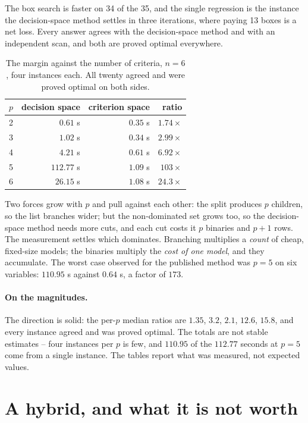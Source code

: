 \documentclass[11pt,a4paper]{article}
\begin{document}
The box search is faster on 34 of the 35, and the single regression is the
instance the decision-space method settles in three iterations, where paying 13
boxes is a net loss. Every answer agrees with the decision-space method and
with an independent scan, and both are proved optimal everywhere.

\begin{table}[h]
\centering
\caption{The margin against the number of criteria, $n = 6$, four instances
each. All twenty agreed and were proved optimal on both sides.}
\begin{tabular}{crrr}
\toprule
$p$ & decision space & criterion space & ratio \\
\midrule
2 & $0.61$ s   & $0.35$ s & $1.74\times$ \\
3 & $1.02$ s   & $0.34$ s & $2.99\times$ \\
4 & $4.21$ s   & $0.61$ s & $6.92\times$ \\
5 & $112.77$ s & $1.09$ s & $103\times$ \\
6 & $26.15$ s  & $1.08$ s & $24.3\times$ \\
\bottomrule
\end{tabular}
\end{table}

Two forces grow with $p$ and pull against each other: the split produces $p$
children, so the list branches wider; but the non-dominated set grows too, so
the decision-space method needs more cuts, and each cut costs it $p$ binaries
and $p+1$ rows. The measurement settles which dominates. Branching multiplies a
\emph{count} of cheap, fixed-size models; the binaries multiply the \emph{cost
of one model}, and they accumulate. The worst case observed for the published
method was $p = 5$ on six variables: $110.95$ s against $0.64$ s, a factor of
$173$.

\paragraph{On the magnitudes.} The direction is solid: the per-$p$ median
ratios are $1.35$, $3.2$, $2.1$, $12.6$, $15.8$, and every instance agreed and
was proved optimal. The totals are not stable estimates -- four instances per
$p$ is few, and $110.95$ of the $112.77$ seconds at $p=5$ come from a single
instance. The tables report what was measured, not expected values.

\section{A hybrid, and what it is not worth}
\end{document}
